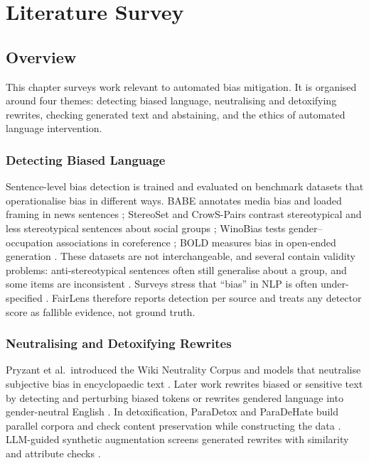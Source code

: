 \documentclass[12pt,a4paper,oneside]{report}
\begin{document}
\chapter{Literature Survey}\label{ch:lit}

\section{Overview}
This chapter surveys work relevant to automated bias mitigation. It is organised around four themes: detecting biased
language, neutralising and detoxifying rewrites, checking generated text and abstaining, and the ethics of automated
language intervention.

\subsection{Detecting Biased Language}
Sentence-level bias detection is trained and evaluated on benchmark datasets that operationalise bias in different
ways. BABE annotates media bias and loaded framing in news sentences \cite{babe}; StereoSet and CrowS-Pairs contrast
stereotypical and less stereotypical sentences about social groups \cite{stereoset,crows}; WinoBias tests
gender--occupation associations in coreference \cite{winobias}; BOLD measures bias in open-ended generation \cite{bold}.
These datasets are not interchangeable, and several contain validity problems: anti-stereotypical sentences often still
generalise about a group, and some items are inconsistent \cite{salmon}. Surveys stress that ``bias'' in NLP is often
under-specified \cite{blodgett2020,gallegos}. FairLens therefore reports detection per source and treats any detector
score as fallible evidence, not ground truth.

\subsection{Neutralising and Detoxifying Rewrites}
Pryzant et al.\ introduced the Wiki Neutrality Corpus and models that neutralise subjective bias in encyclopaedic text
\cite{pryzant}. Later work rewrites biased or sensitive text by detecting and perturbing biased tokens \cite{depen} or
rewrites gendered language into gender-neutral English \cite{theythem}. In detoxification, ParaDetox and ParaDeHate build
parallel corpora and check content preservation while constructing the data \cite{paradetox,paradehate}. LLM-guided
synthetic augmentation screens generated rewrites with similarity and attribute checks \cite{lgsa}.
\end{document}
